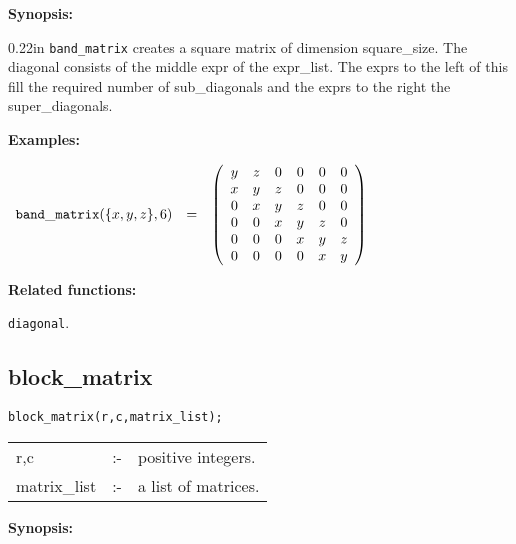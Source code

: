 {\bf Synopsis:} %

\begin{addtolength}{\leftskip}{0.22in}
                {\tt band\_matrix} creates a square matrix of dimension
                square\_size. The diagonal consists of the middle expr
                of the expr\_list. The exprs to the left of this fill
                the required number of sub\_diagonals and the exprs
                to the right the super\_diagonals.

\end{addtolength}

{\bf Examples:}

\begin{flushleft}
\hspace*{0.1in}
\begin{math}
\begin{array}{ccc}
{\tt band\_matrix}(\{x,y,z\},6) & = &
\left( \begin{array}{cccccc} y & z & 0 & 0 & 0 & 0 \\ x & y & z & 0 & 0
& 0 \\ 0 & x & y & z & 0 & 0 \\ 0 & 0 & x & y & z & 0 \\ 0 & 0 & 0 & x &
 y & z \\ 0 & 0 & 0 & 0 & x & y
\end{array} \right)
\end{array}
\end{math}
\end{flushleft}

{\bf Related functions:}

\hspace*{0.175in} {\tt diagonal}.


\subsection{block\_matrix}


\hspace*{0.175in} {\tt block\_matrix(r,c,matrix\_list);}

\hspace*{0.1in}
\begin{tabular}{l l l}
r,c          &:-& positive integers. \\
matrix\_list &:-& a list of matrices.
\end{tabular}

{\bf Synopsis:} %

